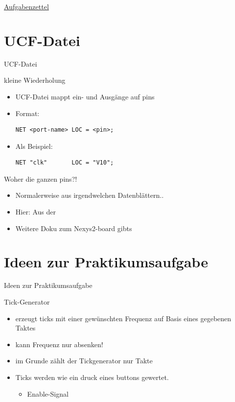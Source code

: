 \documentclass[aspectratio=169,presentation]{beamer}
\newcommand{\sectionframe}[1]{
	\begin{frame}
		\vfill
		\Huge
		\centering
		\usebeamercolor[fg]{title}
		#1
		\vfill
		\par
	\end{frame}
}
\begin{document}
\sectionframe{\href{http://users.informatik.haw-hamburg.de/~schafers/LOCAL/S19S_CE/Aufgabenzettel_Nr1_v15.pdf}{Aufgabenzettel}}

\section{UCF-Datei}
\sectionframe{UCF-Datei}
\begin{frame} [fragile] {kleine Wiederholung}
	\begin{itemize}
		\item UCF-Datei mappt ein- und Ausgänge auf pins
		\item Format:
		\begin{lstlisting}
NET <port-name> LOC = <pin>;
		\end{lstlisting}
		\item Als Beispiel:
		\begin{lstlisting}
NET "clk"		LOC = "V10";
		\end{lstlisting}
	\end{itemize}
\end{frame}

\begin{frame} [fragile] {Woher die ganzen pins?!}
	\begin{itemize}
		\item Normalerweise aus irgendwelchen Datenblättern..
		\item Hier: Aus der 
		\href{https://users.informatik.haw-hamburg.de/~behn/pub/CEP/FPGA_CE Board.pdf}{}
		\item Weitere Doku zum Nexys2-board gibts \href{http://users.informatik.haw-hamburg.de/~schafers/LOCAL/S19S_CE/DOCU/OLD Digilent Nexys2 Board Reference Manual.pdf}{\color{red}{HIER}}
	\end{itemize}
\end{frame}


\section{Ideen zur Praktikumsaufgabe}
\sectionframe{Ideen zur Praktikumsaufgabe}
\begin{frame} {Tick-Generator}
	\begin{itemize}
		\item erzeugt ticks mit einer gewünschten Frequenz auf Basis eines gegebenen Taktes
		\item kann Frequenz nur absenken!
		\item im Grunde zählt der Tickgenerator nur Takte\\
		\item Ticks werden wie ein druck eines buttons gewertet.
		\begin{itemize}
			 \item Enable-Signal
		\end{itemize}
	\end{itemize}
\end{frame}
\end{document}
